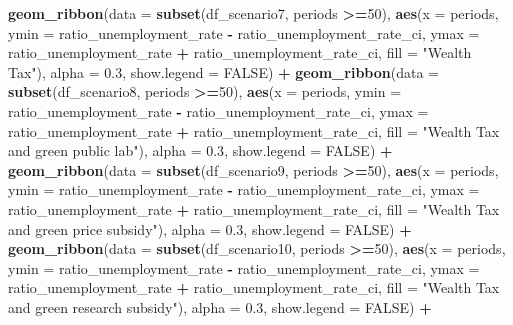 \documentclass[
]{article}
\newenvironment{Shaded}{\begin{snugshade}}{\end{snugshade}}
\newcommand{\AttributeTok}[1]{\textcolor[rgb]{0.13,0.29,0.53}{#1}}
\newcommand{\ConstantTok}[1]{\textcolor[rgb]{0.56,0.35,0.01}{#1}}
\newcommand{\DecValTok}[1]{\textcolor[rgb]{0.00,0.00,0.81}{#1}}
\newcommand{\FloatTok}[1]{\textcolor[rgb]{0.00,0.00,0.81}{#1}}
\newcommand{\FunctionTok}[1]{\textcolor[rgb]{0.13,0.29,0.53}{\textbf{#1}}}
\newcommand{\NormalTok}[1]{#1}
\newcommand{\SpecialCharTok}[1]{\textcolor[rgb]{0.81,0.36,0.00}{\textbf{#1}}}
\newcommand{\StringTok}[1]{\textcolor[rgb]{0.31,0.60,0.02}{#1}}
\begin{document}
\begin{Shaded}
\begin{Highlighting}[]
  \FunctionTok{geom\_ribbon}\NormalTok{(}\AttributeTok{data =} \FunctionTok{subset}\NormalTok{(df\_scenario7, periods }\SpecialCharTok{\textgreater{}=}\DecValTok{50}\NormalTok{), }\FunctionTok{aes}\NormalTok{(}\AttributeTok{x =}\NormalTok{ periods, }\AttributeTok{ymin =}\NormalTok{ ratio\_unemployment\_rate }\SpecialCharTok{{-}}\NormalTok{ ratio\_unemployment\_rate\_ci, }\AttributeTok{ymax =}\NormalTok{ ratio\_unemployment\_rate }\SpecialCharTok{+}\NormalTok{ ratio\_unemployment\_rate\_ci, }\AttributeTok{fill =} \StringTok{"Wealth Tax"}\NormalTok{), }\AttributeTok{alpha =} \FloatTok{0.3}\NormalTok{, }\AttributeTok{show.legend =} \ConstantTok{FALSE}\NormalTok{) }\SpecialCharTok{+}
  \FunctionTok{geom\_ribbon}\NormalTok{(}\AttributeTok{data =} \FunctionTok{subset}\NormalTok{(df\_scenario8, periods }\SpecialCharTok{\textgreater{}=}\DecValTok{50}\NormalTok{), }\FunctionTok{aes}\NormalTok{(}\AttributeTok{x =}\NormalTok{ periods, }\AttributeTok{ymin =}\NormalTok{ ratio\_unemployment\_rate }\SpecialCharTok{{-}}\NormalTok{ ratio\_unemployment\_rate\_ci, }\AttributeTok{ymax =}\NormalTok{ ratio\_unemployment\_rate }\SpecialCharTok{+}\NormalTok{ ratio\_unemployment\_rate\_ci, }\AttributeTok{fill =} \StringTok{"Wealth Tax and green public lab"}\NormalTok{), }\AttributeTok{alpha =} \FloatTok{0.3}\NormalTok{, }\AttributeTok{show.legend =} \ConstantTok{FALSE}\NormalTok{) }\SpecialCharTok{+}
  \FunctionTok{geom\_ribbon}\NormalTok{(}\AttributeTok{data =} \FunctionTok{subset}\NormalTok{(df\_scenario9, periods }\SpecialCharTok{\textgreater{}=}\DecValTok{50}\NormalTok{), }\FunctionTok{aes}\NormalTok{(}\AttributeTok{x =}\NormalTok{ periods, }\AttributeTok{ymin =}\NormalTok{ ratio\_unemployment\_rate }\SpecialCharTok{{-}}\NormalTok{ ratio\_unemployment\_rate\_ci, }\AttributeTok{ymax =}\NormalTok{ ratio\_unemployment\_rate }\SpecialCharTok{+}\NormalTok{ ratio\_unemployment\_rate\_ci, }\AttributeTok{fill =} \StringTok{"Wealth Tax and green price subsidy"}\NormalTok{), }\AttributeTok{alpha =} \FloatTok{0.3}\NormalTok{, }\AttributeTok{show.legend =} \ConstantTok{FALSE}\NormalTok{) }\SpecialCharTok{+}
  \FunctionTok{geom\_ribbon}\NormalTok{(}\AttributeTok{data =} \FunctionTok{subset}\NormalTok{(df\_scenario10, periods }\SpecialCharTok{\textgreater{}=}\DecValTok{50}\NormalTok{), }\FunctionTok{aes}\NormalTok{(}\AttributeTok{x =}\NormalTok{ periods, }\AttributeTok{ymin =}\NormalTok{ ratio\_unemployment\_rate }\SpecialCharTok{{-}}\NormalTok{ ratio\_unemployment\_rate\_ci, }\AttributeTok{ymax =}\NormalTok{ ratio\_unemployment\_rate }\SpecialCharTok{+}\NormalTok{ ratio\_unemployment\_rate\_ci, }\AttributeTok{fill =} \StringTok{"Wealth Tax and green research subsidy"}\NormalTok{), }\AttributeTok{alpha =} \FloatTok{0.3}\NormalTok{, }\AttributeTok{show.legend =} \ConstantTok{FALSE}\NormalTok{) }\SpecialCharTok{+}

\end{Highlighting}
\end{Shaded}
\end{document}
